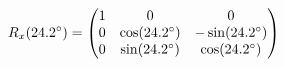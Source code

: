 \documentclass[preview]{standalone}
\begin{document}
\begin{align*}
\special{dvisvgm:raw <g id='unique000'>}R_x(24.2^\circ) = \begin{pmatrix} 1 & 0 & 0 \\ 0 & \cos(24.2^\circ) & -\sin(24.2^\circ) \\ 0 & \sin(24.2^\circ) & \cos(24.2^\circ) \end{pmatrix}\special{dvisvgm:raw </g>}
\end{align*}
\end{document}
